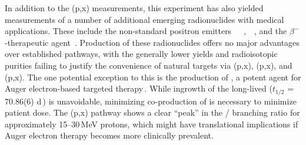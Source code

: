 In addition to the (p,x) measurements, this experiment has also yielded measurements of  a number of additional  emerging radionuclides with medical applications.
These include the non-standard positron emitters 
\,\cite{Muller2013,Filosofov2010,Qaim2011}
\,\cite{Thisgaard2011,Zaman1996,Hermanne2000a}
\,\cite{PMID:7632762,zweit1996medium,Graves2016,Rosch2014}, 
\,\cite{Szelecsenyi2005a,Fukumura2004}
\,\cite{Lewis2003,Bandari2014,mp500671j,Szelecsenyi1993,Aslam2009,Hilgers2003,Szelecsenyi2005,Voyles2017},
and the $\beta^-$-therapeutic agent 
\,\cite{Muller2014,Deilami-nezhad2016}.
Production of these radionuclides offers no major advantages over established pathways, with the generally lower yields and radioisotopic purities failing to justify the convenience of natural targets  via   (p,x), (p,x), and  (p,x). 
The one potential exception to this is the production of , a potent agent for Auger electron-based targeted therapy\,\cite{Thisgaard2011a,Valdovinos2017b,Thisgaard2014a}.
While ingrowth of the long-lived  ($t_{1/2}$ = 70.86(6) d\,\cite{Nesaraja2010}) is unavoidable, minimizing co-production of  is necessary to minimize patient dose.
The (p,x) pathway shows a clear \enquote{peak} in the / branching ratio for approximately 15--30\,MeV protons, which might have translational implications if Auger electron therapy becomes more clinically prevalent. 





